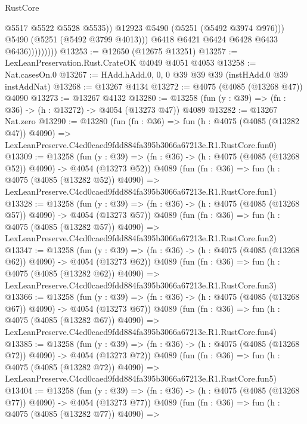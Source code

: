 \begin{lexlean}{RustCore}
\begin{coremodule}
                              @5517
                              @5522
                              @5528
                              @5535))
                          @12923
                          @5490
                          (@5251 (@5492 @3974 @976)))
                        @5490
                        (@5251 (@5492 @3799 @4013)))
                      @6418
                      @6421
                      @6424
                      @6428
                      @6433
                      @6436)))))))))
@13253 := @12650 (@12675 @13251)
@13257 := LexLeanPreservation.Rust.CrateOK @4049 @4051 @4053
@13258 := Nat.casesOn.{0}
@13267 := HAdd.hAdd.{0, 0, 0} @39 @39 @39 (instHAdd.{0} @39 instAddNat)
@13268 := @13267 @4134
@13272 := @4075 (@4085 (@13268 @47)) @4090
@13273 := @13267 @4132
@13280 := @13258 (fun (y : @39) => (fn : @36) -> (h : @13272) -> @4054 (@13273 @47)) @4089
@13282 := @13267 Nat.zero
@13290 := @13280
    (fun (fn : @36) =>
    fun (h : @4075 (@4085 (@13282 @47)) @4090) =>
    LexLeanPreserve.C4cd0caed9fdd884fa395b3066a67213e.R1.RustCore.fun0)
@13309 := @13258
    (fun (y : @39) => (fn : @36) -> (h : @4075 (@4085 (@13268 @52)) @4090) -> @4054 (@13273 @52))
    @4089
    (fun (fn : @36) =>
    fun (h : @4075 (@4085 (@13282 @52)) @4090) =>
    LexLeanPreserve.C4cd0caed9fdd884fa395b3066a67213e.R1.RustCore.fun1)
@13328 := @13258
    (fun (y : @39) => (fn : @36) -> (h : @4075 (@4085 (@13268 @57)) @4090) -> @4054 (@13273 @57))
    @4089
    (fun (fn : @36) =>
    fun (h : @4075 (@4085 (@13282 @57)) @4090) =>
    LexLeanPreserve.C4cd0caed9fdd884fa395b3066a67213e.R1.RustCore.fun2)
@13347 := @13258
    (fun (y : @39) => (fn : @36) -> (h : @4075 (@4085 (@13268 @62)) @4090) -> @4054 (@13273 @62))
    @4089
    (fun (fn : @36) =>
    fun (h : @4075 (@4085 (@13282 @62)) @4090) =>
    LexLeanPreserve.C4cd0caed9fdd884fa395b3066a67213e.R1.RustCore.fun3)
@13366 := @13258
    (fun (y : @39) => (fn : @36) -> (h : @4075 (@4085 (@13268 @67)) @4090) -> @4054 (@13273 @67))
    @4089
    (fun (fn : @36) =>
    fun (h : @4075 (@4085 (@13282 @67)) @4090) =>
    LexLeanPreserve.C4cd0caed9fdd884fa395b3066a67213e.R1.RustCore.fun4)
@13385 := @13258
    (fun (y : @39) => (fn : @36) -> (h : @4075 (@4085 (@13268 @72)) @4090) -> @4054 (@13273 @72))
    @4089
    (fun (fn : @36) =>
    fun (h : @4075 (@4085 (@13282 @72)) @4090) =>
    LexLeanPreserve.C4cd0caed9fdd884fa395b3066a67213e.R1.RustCore.fun5)
@13404 := @13258
    (fun (y : @39) => (fn : @36) -> (h : @4075 (@4085 (@13268 @77)) @4090) -> @4054 (@13273 @77))
    @4089
    (fun (fn : @36) =>
    fun (h : @4075 (@4085 (@13282 @77)) @4090) =>

\end{coremodule}
\end{lexlean}
